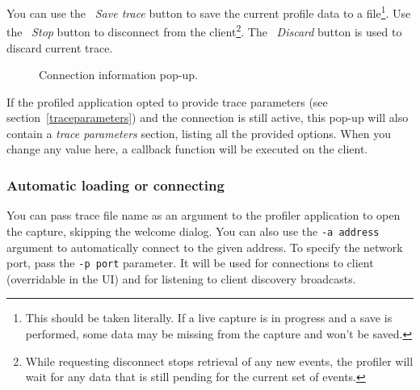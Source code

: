 \documentclass[hidelinks,titlepage,a4paper]{article}
\begin{document}
You can use the \faSave{}~\emph{Save trace} button to save the current profile data to a file\footnote{This should be taken literally. If a live capture is in progress and a save is performed, some data may be missing from the capture and won't be saved.}. Use the \faPlug{}~\emph{Stop} button to disconnect from the client\footnote{While requesting disconnect stops retrieval of any new events, the profiler will wait for any data that is still pending for the current set of events.}. The \faExclamationTriangle{}~\emph{Discard} button is used to discard current trace.

\begin{figure}[h]
\centering{}
\caption{Connection information pop-up.}
\label{connectioninfo}
\end{figure}

If the profiled application opted to provide trace parameters (see section~\ref{traceparameters}) and the connection is still active, this pop-up will also contain a \emph{trace parameters} section, listing all the provided options. When you change any value here, a callback function will be executed on the client.

\subsubsection{Automatic loading or connecting}

You can pass trace file name as an argument to the profiler application to open the capture, skipping the welcome dialog. You can also use the \texttt{-a address} argument to automatically connect to the given address. To specify the network port, pass the \texttt{-p port} parameter. It will be used for connections to client (overridable in the UI) and for listening to client discovery broadcasts.
\end{document}
